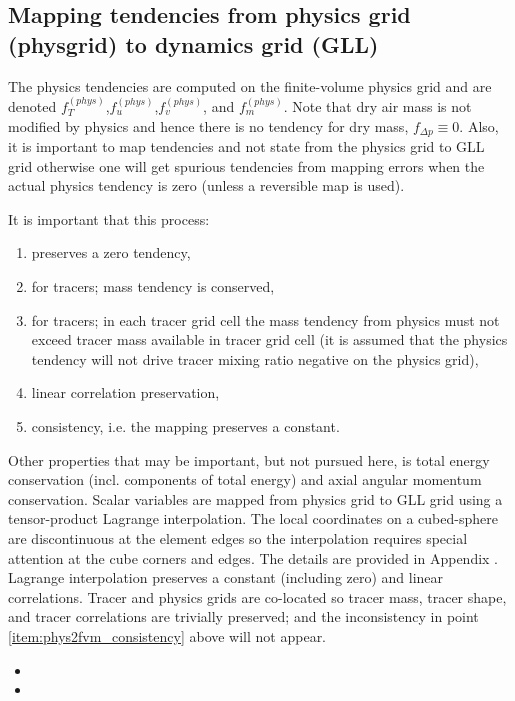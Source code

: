 {\color{red}{explain why we are not using Paul's mapping method}}
\subsection{Mapping tendencies from physics grid (physgrid) to dynamics grid (GLL)}
The physics tendencies are computed on the finite-volume physics grid and are denoted $f_T^{(phys)}$,$f_u^{(phys)}$,$f_v^{(phys)}$, and $f_m^{(phys)}$. Note that dry air mass is not modified by physics and hence there is no tendency for dry mass,  $f_{\Delta p}\equiv 0$. Also, it is important to map tendencies and not state from the physics grid to GLL grid otherwise one will get spurious tendencies from mapping errors when the actual physics tendency is zero (unless a reversible map is used).

It is important that this process:
\begin{enumerate}
\item preserves a zero tendency,
\item for tracers; mass tendency is conserved,
\item for tracers; in each tracer grid cell the mass tendency from physics must not exceed tracer mass available in tracer grid cell (it is assumed that the physics tendency will not drive tracer mixing ratio negative on the physics grid),\label{item:phys2fvm_consistency}
\item linear correlation preservation,
\item consistency, i.e. the mapping preserves a constant.
\end{enumerate}
Other properties that may be important, but not pursued here, is total energy conservation (incl. components of total energy) and axial angular momentum conservation. Scalar variables are mapped from physics grid to GLL grid using a tensor-product Lagrange interpolation. The local coordinates on a cubed-sphere are discontinuous at the element edges so the interpolation requires special attention at the cube corners and edges. The details are provided in Appendix {\color{red}{XXX}}. Lagrange interpolation preserves a constant (including zero) and linear correlations. Tracer and physics grids are co-located so tracer mass, tracer shape, and tracer correlations are trivially preserved; and the inconsistency in point \ref{item:phys2fvm_consistency} above will not appear.

\begin{itemize}
\item {\color{red}{mention why we are not doing cslam-like mapping; mention why we are not using Paul's algorithm}}
\item {}
\end{itemize}



